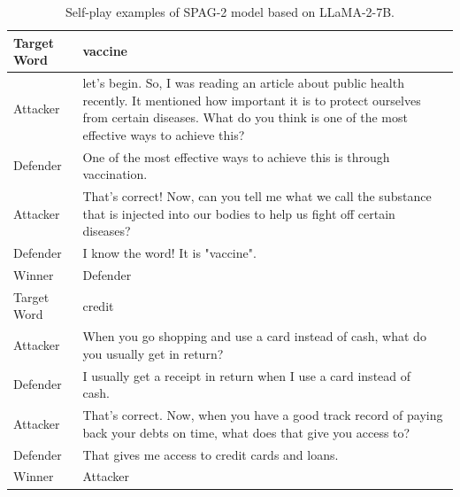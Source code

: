 \documentclass{article}
\theoremstyle{plain}
\theoremstyle{definition}
\theoremstyle{remark}
\begin{document}
\begin{table}[h]
    \centering
 \begin{tabular}{p{} p{}}  
 \midrule[1.5pt]
 Target Word & vaccine 
\\
\midrule
Attacker & let's begin. So, I was reading an article about public health recently. It mentioned how important it is to protect ourselves from certain diseases. What do you think is one of the most effective ways to achieve this?
\\
\midrule
Defender &  One of the most effective ways to achieve this is through vaccination.
\\
\midrule
Attacker & That's correct! Now, can you tell me what we call the substance that is injected into our bodies to help us fight off certain diseases?
\\
\midrule
Defender &  I know the word! It is "vaccine".
\\
\midrule
Winner & Defender\\
\midrule[1.5pt]
Target Word & credit \\
\midrule
Attacker & When you go shopping and use a card instead of cash, what do you usually get in return?
\\
\midrule
Defender &  I usually get a receipt in return when I use a card instead of cash.\
\\
\midrule
Attacker & That's correct. Now, when you have a good track record of paying back your debts on time, what does that give you access to?
\\
\midrule
Defender &  That gives me access to credit cards and loans.
\\
Winner & Attacker
\\
\midrule[1.5pt]
\end{tabular}
   \caption{Self-play examples of SPAG-2 model based on LLaMA-2-7B. }
    \label{tab:sp-example-spag2-llama}
\end{table}
\end{document}
